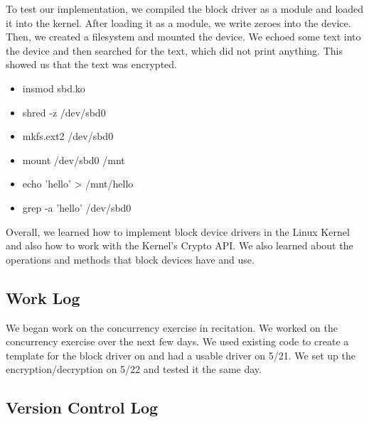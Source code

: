 \documentclass[journal, letterpaper, draftclsnofoot, onecolumn, 10pt]{IEEEtran}
\begin{document}

To test our implementation, we compiled the block driver as a module and loaded it into the kernel.
After loading it as a module, we write zeroes into the device. Then, we created a filesystem and mounted the device.
We echoed some text into the device and then searched for the text, which did not print anything.
This showed us that the text was encrypted.

\begin{itemize}
    \item insmod sbd.ko
    \item shred -z /dev/sbd0
    \item mkfs.ext2 /dev/sbd0
    \item mount /dev/sbd0 /mnt
    \item echo 'hello' > /mnt/hello
    \item grep -a 'hello' /dev/sbd0
\end{itemize}



Overall, we learned how to implement block device drivers in the Linux Kernel and also how to work with the Kernel's Crypto API.
We also learned about the operations and methods that block devices have and use. \\


\subsection{Work Log}
We began work on the concurrency exercise in recitation. We worked on the concurrency exercise over the next few days.
We used existing code to create a template for the block driver on and had a usable driver on 5/21.
We set up the encryption/decryption on 5/22 and tested it the same day.



\clearpage
\subsection{Version Control Log}



\FloatBarrier



\scalebox{0.8}{
}


\FloatBarrier
\end{document}
